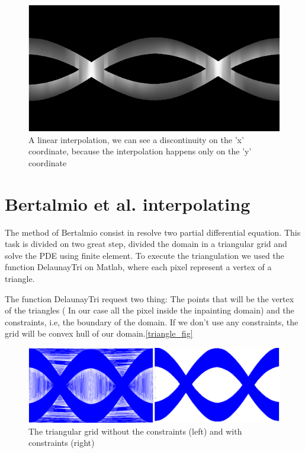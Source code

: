 \begin{figure}[h]
\centering
\includegraphics[scale=0.7]{img/linear_interpolation}
\caption{{A linear interpolation, we can see a discontinuity on the 'x' coordinate, because the interpolation happens only on the 'y' coordinate}}\label{linear_interpolation}
\end{figure}


\section{Bertalmio et al. interpolating}
The method of Bertalmio consist in resolve two partial differential equation. This task is divided on two great step, divided the domain in a triangular grid and solve the PDE using finite element.
To execute the triangulation we used the function DelaunayTri on Matlab, where each pixel represent a vertex of a triangle.

The function DelaunayTri request two thing: The points that will be the vertex of the triangles ( In our case all the pixel inside the inpainting domain) and the constraints, i.e, the boundary of the domain. If we don't use any constraints, the grid will be convex hull of our domain.\eqref{triangle_fig}

\begin{figure}[h]
\centering
\includegraphics[scale=1]{img/triangle}
\caption{{The triangular grid without the constraints (left) and with constraints (right)}}\label{triangle_fig}
\end{figure}

